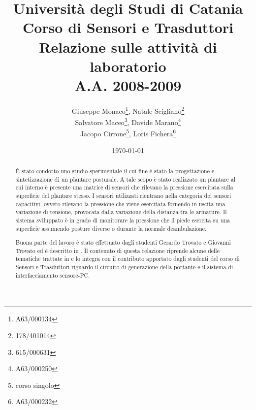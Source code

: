 \documentclass[12pt,a4paper,oneside,openright,italian]{article}
\begin{document}
\title{Universit\`a degli Studi di Catania \\ Corso di Sensori e Trasduttori \\ Relazione sulle attivit\`a di laboratorio \\ A.A. 2008-2009}
\author{Giuseppe Monaco\footnote{A63/000134}, Natale Scigliano\footnote{178/401014}\\ Salvatore Maceo\footnote{615/000631}, Davide Marano\footnote{A63/000250}\\ Jacopo Cirrone\footnote{corso singolo}, Loris Fichera\footnote{A63/000232}}

\date{\today}  
\maketitle
\begin{abstract}
\`E stato condotto uno studio sperimentale il cui fine \`e stato la progettazione e sintetizzazione di un plantare posturale. A tale scopo \`e stato realizzato un plantare al cui interno \`e presente una matrice di sensori che rilevano la pressione esercitata sulla superficie del plantare stesso. 
I sensori utilizzati rientrano nella categoria dei sensori capacitivi, ovvero rilevano la pressione che viene esercitata fornendo in uscita una variazione di tensione, provocata dalla variazione della distanza tra le armature. Il sistema sviluppato \`e in grado di monitorare la pressione che il piede esercita su una superficie assumendo posture diverse o durante la normale deambulazione.

Buona parte del lavoro \`e stato effettuato dagli studenti Gerardo Trovato e Giovanni Trovato ed \`e descritto in \cite{trovato1}. Il contenuto di questa relazione riprende alcune delle tematiche trattate in \cite{trovato1} e lo integra con il contributo apportato dagli studenti del corso di Sensori e Trasduttori riguardo il circuito di generazione della portante e il sistema di interfacciamento sensore-PC.
\end{abstract}
\end{document}
